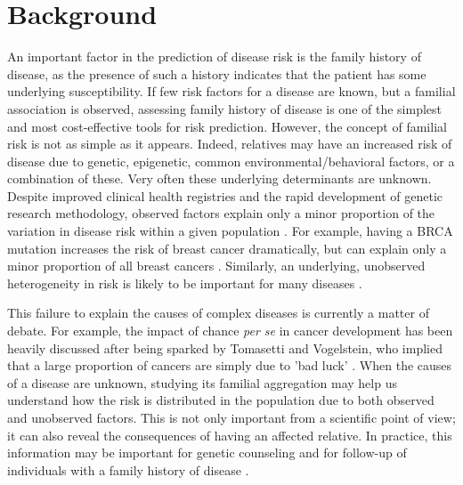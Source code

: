 \documentclass{bmcart}
\begin{document}
\section*{Background}
An important factor in the prediction of disease risk is the family history of disease, as the presence of such a history indicates that the patient has some underlying susceptibility. If few risk factors for a disease are known, but a familial association is observed, assessing family history of disease is one of the simplest and most cost-effective tools for risk prediction. However, the concept of familial risk is not as simple as it appears. Indeed, relatives may have an increased risk of disease due to genetic, epigenetic, common environmental/behavioral factors, or a combination of these. Very often these underlying determinants are unknown. Despite improved clinical health registries and the rapid development of genetic research methodology, observed factors explain only a minor proportion of the variation in disease risk within a given population \cite{aalen2014understanding}. For example, having a BRCA mutation increases the risk of breast cancer dramatically, but can explain only a minor proportion of all breast cancers \cite{balmain2003genetics}. Similarly, an underlying, unobserved heterogeneity in risk is likely to be important for many diseases \cite{aalen2014understanding}.

This failure to explain the causes of complex diseases is currently a matter of debate. For example, the impact of chance \textit{per se} in cancer development has been heavily discussed after being sparked by Tomasetti and Vogelstein, who implied that a large proportion of cancers are simply due to 'bad luck' \cite{tomasetti2015variation,Stensrud201783}. When the causes of a disease are unknown, studying its familial aggregation may help us understand how the risk is distributed in the population due to both observed and unobserved factors. This is not only important from a scientific point of view; it can also reveal the consequences of having an affected relative. In practice, this information may be important for genetic counseling and for follow-up of individuals with a family history of disease \cite{riley2012essential}. 
\end{document}
